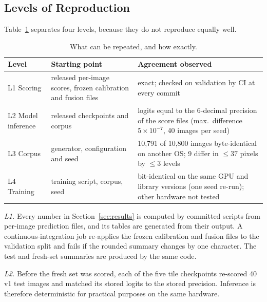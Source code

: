 \documentclass[conference]{IEEEtran}
\begin{document}
\subsection{Levels of Reproduction}
\label{app:levels}

Table~\ref{tab:repro-levels} separates four levels, because they do not
reproduce equally well.

\begin{table}[!t]
\caption{What can be repeated, and how exactly.}
\label{tab:repro-levels}
\centering
\scriptsize
\setlength{\tabcolsep}{3pt}
\renewcommand{\arraystretch}{1.12}
\begin{tabular}{@{}p{} p{} p{}@{}}
\toprule
Level & Starting point & Agreement observed \\
\midrule
L1 Scoring & released per-image scores, frozen calibration and fusion files
  & exact; checked on validation by CI at every commit \\
L2 Model inference & released checkpoints and corpus
  & logits equal to the 6-decimal precision of the score files
    (max.\ difference $5{\times}10^{-7}$, 40 images per seed) \\
L3 Corpus & generator, configuration and seed
  & 10,791 of 10,800 images byte-identical on another OS; 9 differ in ${\le}37$ pixels by ${\le}3$ levels \\
L4 Training & training script, corpus, seed
  & bit-identical on the same GPU and library versions (one seed re-run); other hardware not tested \\
\bottomrule
\end{tabular}
\end{table}

\emph{L1.} Every number in Section~\ref{sec:results} is computed by
committed scripts from per-image prediction files, and its tables are
generated from their output. A continuous-integration job
re-applies the frozen calibration and fusion files to the validation
split and fails if the rounded summary changes by one character. The
test and fresh-set summaries are produced by the same code.

\emph{L2.} Before the fresh set was scored, each of the five tile
checkpoints re-scored 40 v1 test images and matched its stored logits
to the stored precision. Inference is therefore deterministic for
practical purposes on the same hardware.
\end{document}
